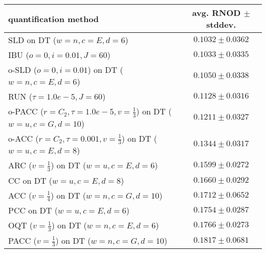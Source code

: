 \begin{tabular}{lc}
  \toprule
  quantification method & avg. RNOD $\pm$ stddev. \\
  \midrule
  SLD on DT ($w=n, c=E, d=6$) & $\mathbf{0.1032 \pm 0.0362}$ \\
  IBU ($o=0, i=0.01, J=60$) & $\mathbf{0.1033 \pm 0.0335}$ \\
  o-SLD ($o=0, i=0.01$) on DT ($w=n, c=E, d=6$) & $0.1050 \pm 0.0338$ \\
  RUN ($\tau=1.0e-5, J=60$) & $0.1128 \pm 0.0316$ \\
  o-PACC ($r=C_2, \tau=1.0e-5, v=\frac{1}{3}$) on DT ($w=u, c=G, d=10$) & $0.1211 \pm 0.0327$ \\
  o-ACC ($r=C_2, \tau=0.001, v=\frac{1}{3}$) on DT ($w=u, c=E, d=8$) & $0.1344 \pm 0.0317$ \\
  ARC ($v=\frac{1}{3}$) on DT ($w=u, c=E, d=6$) & $0.1599 \pm 0.0272$ \\
  CC on DT ($w=u, c=E, d=8$) & $0.1660 \pm 0.0292$ \\
  ACC ($v=\frac{1}{4}$) on DT ($w=n, c=G, d=10$) & $0.1712 \pm 0.0652$ \\
  PCC on DT ($w=u, c=E, d=6$) & $0.1754 \pm 0.0287$ \\
  OQT ($v=\frac{1}{3}$) on DT ($w=n, c=E, d=6$) & $0.1766 \pm 0.0273$ \\
  PACC ($v=\frac{1}{3}$) on DT ($w=n, c=G, d=10$) & $0.1817 \pm 0.0681$ \\
  \bottomrule
\end{tabular}
